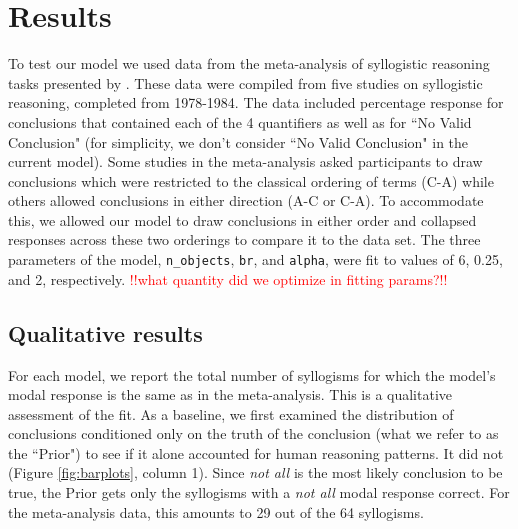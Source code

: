 \documentclass[10pt,letterpaper]{article}
\newcommand{\red}[1]{\textcolor{Red}{#1}}
\begin{document}
\section{Results}

To test our model we used data from the meta-analysis of syllogistic reasoning tasks presented by . These data were compiled from five studies on syllogistic reasoning, completed from 1978-1984. The data included percentage response for conclusions that contained each of the 4 quantifiers as well as for ``No Valid Conclusion" (for simplicity, we don't consider ``No Valid Conclusion" in the current model). Some studies in the meta-analysis asked participants to draw conclusions which were restricted to the classical ordering of terms (C-A) while others allowed conclusions in either direction (A-C or C-A). To accommodate this, we allowed our model to draw conclusions in either order and collapsed responses across these two orderings to compare it to the data set.
%
The three parameters of the model, \lstinline{n_objects}, \lstinline{br}, and \lstinline{alpha}, were fit to values of 6, 0.25, and 2, respectively.
\red{!!what quantity did we optimize in fitting params?!!}

\subsection{Qualitative results}
For each model, we report the total number of syllogisms for which the model's modal response is the same as in the meta-analysis. This is a qualitative assessment of the fit. 
As a baseline, we first examined the distribution of conclusions conditioned only on the truth of the conclusion (what we refer to as the ``Prior") to see if it alone accounted for human reasoning patterns. It did not (Figure \ref{fig:barplots}, column 1). Since \emph{not all} is the most likely conclusion to be true, the Prior gets only the syllogisms with a \emph{not all} modal response correct. For the meta-analysis data, this amounts to 29 out of the 64 syllogisms.
\end{document}
